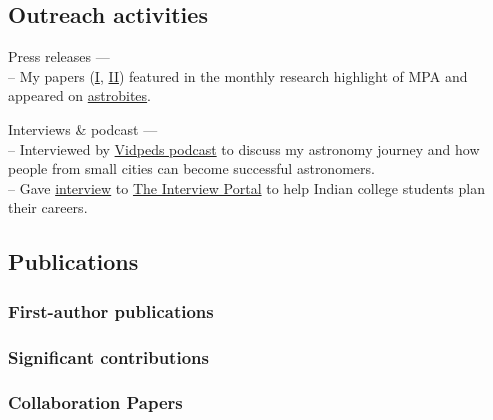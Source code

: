 \documentclass[12pt,letterpaper]{article}
\begin{document}
\subsection{Outreach activities}

\begin{list}{}{\cvlist}
    \item Press releases --- \\
        -- My papers (\href{https://www.mpa-garching.mpg.de/964620/hl202107}{I}, \href{https://www.mpa-garching.mpg.de/1066558/hl202211?c=27981}{II}) featured in the monthly research highlight of MPA and appeared on \href{https://astrobites.org/2021/05/06/cool-metal-gas-search-thanks-it-was-automated/}{astrobites}.
    \item Interviews \& podcast --- \\
      -- Interviewed by \href{https://www.youtube.com/watch?v=WmA_PnYLeCg}{Vidpeds podcast} to discuss my astronomy journey and how people from small cities can become successful astronomers. \\
      -- Gave \href{https://theinterviewportal.com/2020/03/13/astrophysicist-interview-8/}{interview} to \href{https://theinterviewportal.com/}{The Interview Portal} to help Indian college students plan their careers.
  \end{list}

\ifdefined\withpubs
  \subsection{Publications}
  

  \subsubsection{First-author publications}
\begin{list}{}{\cvlist}
   
\end{list}

\subsubsection{Significant contributions}
\begin{list}{}{\cvlist}
  
\end{list}

\subsubsection{Collaboration Papers}
\begin{list}{}{\cvlist}
  
\end{list}
\fi
\end{document}
